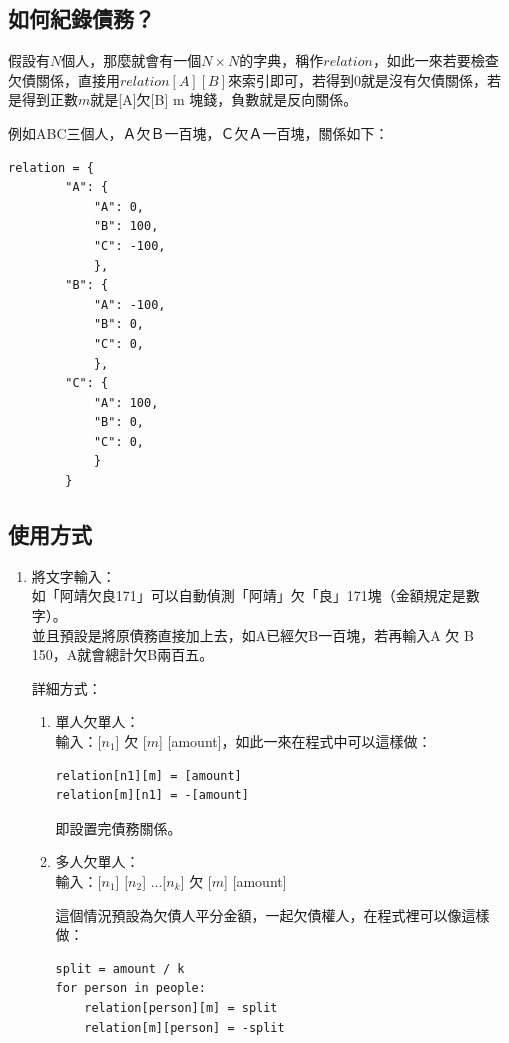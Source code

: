 \documentclass[conference]{IEEEtran}
\begin{document}
\begin{CJK*}{UTF8}{bsmi}
\subsection{如何紀錄債務？}

假設有$N$個人，那麼就會有一個$N \times N$的字典，稱作$relation$，如此一來若要檢查欠債關係，直接用$relation[A][B]$來索引即可，若得到0就是沒有欠債關係，若是得到正數$m$就是[A]欠[B] m 塊錢，負數就是反向關係。

例如ABC三個人，Ａ欠Ｂ一百塊，Ｃ欠Ａ一百塊，關係如下：
\begin{lstlisting}
relation = {
        "A": {
            "A": 0,
            "B": 100,
            "C": -100,
            },
        "B": {
            "A": -100,
            "B": 0,
            "C": 0,
            },
        "C": {
            "A": 100,
            "B": 0,
            "C": 0,
            }
        }
\end{lstlisting}

\subsection{使用方式}

\begin{enumerate}
    \item 將文字輸入：\\ 
    如「阿靖欠良171」可以自動偵測「阿靖」欠「良」171塊（金額規定是數字）。\\ 
    並且預設是將原債務直接加上去，如A已經欠B一百塊，若再輸入A 欠 B 150，A就會總計欠B兩百五。

        詳細方式：
    \begin{enumerate}
    \item 單人欠單人：\\
    輸入：[$n_1$] 欠 [$m$] [amount]，如此一來在程式中可以這樣做：

            \begin{lstlisting}
relation[n1][m] = [amount]
relation[m][n1] = -[amount]
            \end{lstlisting}

    即設置完債務關係。
    \item 多人欠單人：\\
        輸入：[$n_1$] [$n_2$] ...[$n_k]$ 欠 [$m$] [amount]

    這個情況預設為欠債人平分金額，一起欠債權人，在程式裡可以像這樣做：
            \begin{lstlisting}
split = amount / k 
for person in people:
    relation[person][m] = split
    relation[m][person] = -split
            \end{lstlisting}


\end{enumerate}
\end{enumerate}
\end{CJK*}
\end{document}
